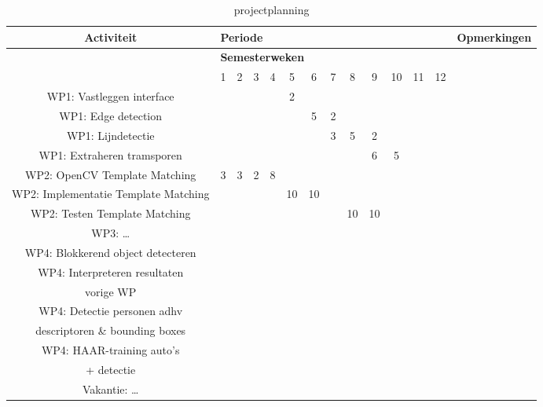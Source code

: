 \documentclass[a4paper,oneside,11pt,final]{memoir}
\begin{document}
\begin{sidewaystable}[h]
	\centering
		\begin{tabular}{|*{14}{c|}}
		\hline
		\textbf{Activiteit} & \multicolumn{12}{l|}{\textbf{Periode}} & \textbf{Opmerkingen} \\
		\hline
							 & \multicolumn{12}{l|}{\textbf{Semesterweken}} &   \\
		\hline 
		  & 1	& 2	& 3	& 4	& 5	& 6	& 7	& 8	& 9	& 10 & 11	& 12 & \\
		\hline 
		WP1: Vastleggen interface & & & & & 2 & & & & & & & & \\
		\hline 
		WP1: Edge detection & & & & & & 5 & 2 & & & & & & \\
		\hline 
		WP1: Lijndetectie & & & & & & & 3 & 5 & 2 & & & & \\
		\hline 
		WP1: Extraheren tramsporen & & & & & & & & & 6 & 5 & & & \\
		\hline 
		\hline 
		WP2: OpenCV Template Matching &  3 & 3 & 2 & 8 & & & & & & & & & \\
		\hline 
		WP2: Implementatie Template Matching & & & & &10&10& & & & & & & \\
		\hline 
		WP2: Testen Template Matching & & & & & & & &10&10&& & &\\
		\hline 
		\hline 
		WP3: \ldots & & & & & & & & & & & & & \\
		\hline 
		\hline 
		WP4: Blokkerend object detecteren& & & & & & & & & & & & & \\
		\hline
		WP4: Interpreteren resultaten & & & & & & & & & & & & & \\
		vorige WP& & & & & & & & & & & & & \\
		\hline
		WP4: Detectie personen adhv & & & & & & & & & & & & & \\
		 descriptoren \& bounding boxes& & & & & & & & & & & & & \\
		\hline
		WP4: HAAR-training auto's & & & & & & & & & & & & & \\
		+ detectie & & & & & & & & & & & & & \\
		\hline 
		Vakantie: \ldots & & & & & & & & & & & & & \\
		\hline
		\end{tabular}
	\caption{projectplanning}
	\label{tab:projectplanning}
\end{sidewaystable}
																							

\end{document}

